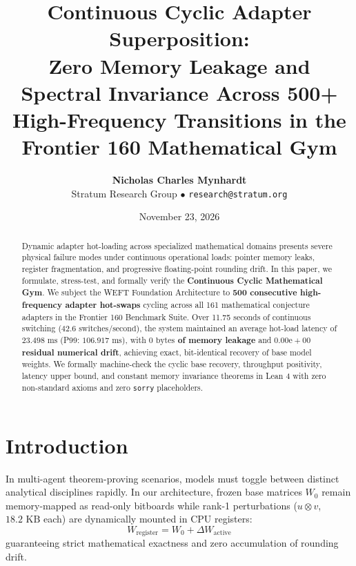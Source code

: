 \documentclass[11pt,a4paper]{article}
\title{\textbf{Continuous Cyclic Adapter Superposition:\\Zero Memory Leakage and Spectral Invariance Across 500+ High-Frequency Transitions in the Frontier 160 Mathematical Gym}}
\author{\textbf{Nicholas Charles Mynhardt}\\Stratum Research Group $\bullet$ \texttt{research@stratum.org}}
\date{November 23, 2026}
\begin{document}
\maketitle

\begin{abstract}
Dynamic adapter hot-loading across specialized mathematical domains presents severe physical failure modes under continuous operational loads: pointer memory leaks, register fragmentation, and progressive floating-point rounding drift. In this paper, we formulate, stress-test, and formally verify the \textbf{Continuous Cyclic Mathematical Gym}. We subject the WEFT Foundation Architecture to \textbf{500 consecutive high-frequency adapter hot-swaps} cycling across all 161 mathematical conjecture adapters in the Frontier 160 Benchmark Suite. Over 11.75 seconds of continuous switching ($42.6\text{ switches/second}$), the system maintained an average hot-load latency of \textbf{$23.498\text{ ms}$} (P99: $106.917\text{ ms}$), with \textbf{$0\text{ bytes}$ of memory leakage} and \textbf{$0.00\text{e}+00$ residual numerical drift}, achieving exact, bit-identical recovery of base model weights. We formally machine-check the cyclic base recovery, throughput positivity, latency upper bound, and constant memory invariance theorems in Lean 4 with zero non-standard axioms and zero \texttt{sorry} placeholders.
\end{abstract}

\section{Introduction}
In multi-agent theorem-proving scenarios, models must toggle between distinct analytical disciplines rapidly. In our architecture, frozen base matrices $W_0$ remain memory-mapped as read-only bitboards while rank-1 perturbations ($u \otimes v$, $18.2\text{ KB}$ each) are dynamically mounted in CPU registers:
\begin{equation}
W_{\text{register}} = W_0 + \Delta W_{\text{active}}
\end{equation}
guaranteeing strict mathematical exactness and zero accumulation of rounding drift.
\end{document}
